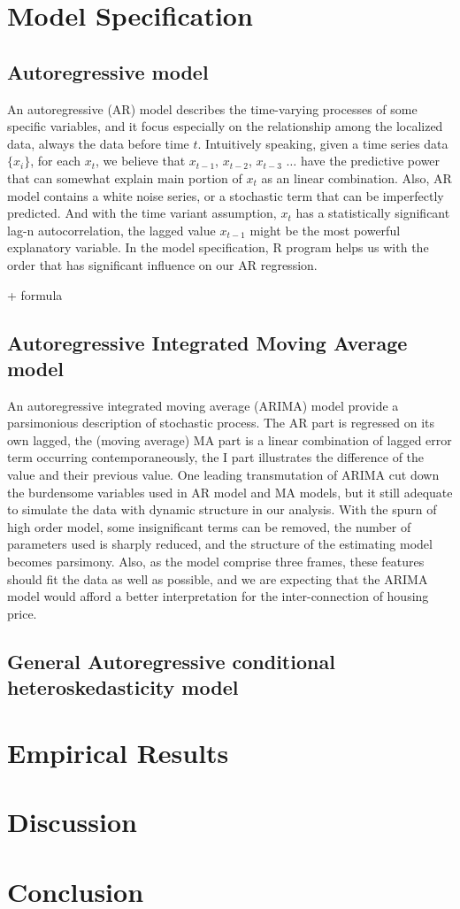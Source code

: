 \documentclass[12pt,letterpaper]{article}
\begin{document}
\section{Model Specification}
\subsection{Autoregressive model}
An autoregressive (AR) model describes the time-varying processes of some specific variables, and it focus especially on the relationship among the localized data, always the data before time $t$. 
Intuitively speaking, given a time series data $ \{x_i\}$, for each $x_t$, we believe that $x_{t-1}$, $x_{t-2}$, $x_{t-3}$ $\dots$ have the predictive power that can somewhat explain main portion of $x_t$ as an linear combination.
Also, AR model contains a white noise series, or a stochastic term that can be imperfectly predicted.
And with the time variant assumption, $x_t$ has a statistically significant lag-n autocorrelation, the lagged value $x_{t-1}$ might be the most powerful explanatory variable.
In the model specification, R program helps us with the order that has significant influence on our AR regression.

+ formula 

\subsection{Autoregressive Integrated Moving Average model}
An autoregressive integrated moving average (ARIMA) model provide a parsimonious description of stochastic process. 
The AR part is regressed on its own lagged, the (moving average) MA part is a linear combination of lagged error term occurring contemporaneously, the I part illustrates the difference of the value and their previous value. 
One leading transmutation of ARIMA cut down the burdensome variables used in AR model and MA models, but it still adequate to simulate the data with dynamic structure in our analysis.
With the spurn of high order model, some insignificant terms can be removed, the number of parameters used is sharply reduced, and the structure of the estimating model becomes parsimony.
Also, as the model comprise three frames, these features should fit the data as well as possible, and we are expecting that the ARIMA model would afford a better interpretation for the inter-connection of housing price.

\subsection{General Autoregressive conditional heteroskedasticity model}



\section{Empirical Results}

\section{Discussion}

\section{Conclusion}
\end{document}
